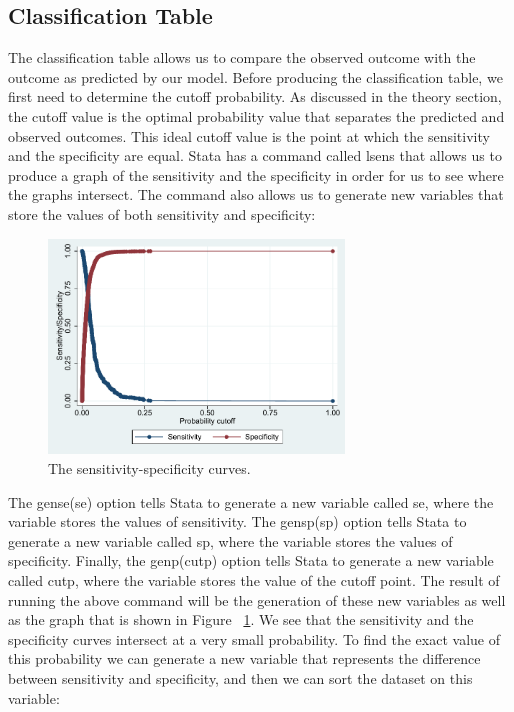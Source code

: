 \documentclass[a4paper,12pt,oneside]{book}
\begin{document}
\subsection{Classification Table}
The classification table allows us to compare the observed outcome with the outcome as predicted by our model. Before producing the classification table, we first need to determine the cutoff 
probability. As discussed in the theory section, the cutoff value is the optimal probability value that separates the predicted and observed outcomes. This ideal cutoff value is the point at which the 
sensitivity and the specificity are equal. Stata has a command called lsens that allows us to produce a graph of the sensitivity and the specificity in order for us to see where the graphs intersect. 
The command also allows us to generate new variables that store the values of both sensitivity and specificity:

\begin{stlog}\end{stlog}
\begin{figure}[h]
    \centering
    \includegraphics[width=0.7\textwidth]{book_37.pdf}
    \caption{The sensitivity-specificity curves.}
    \label{fig:sensspec}
\end{figure}

The gense(se) option tells Stata to generate a new variable called se, where the variable stores the values of sensitivity. The gensp(sp) option tells Stata to generate a new 
variable called sp, where the variable stores the values of specificity. Finally, the genp(cutp) option tells Stata to generate a new variable called cutp, where the variable 
stores the value of the cutoff point. The result of running the above command will be the generation of these new variables as well as the graph that is shown in Figure ~\ref{fig:sensspec}. 
We see that the sensitivity and the specificity curves intersect at a very small probability. To find the exact value of this probability we can generate a new variable that 
represents the difference between sensitivity and specificity, and then we can sort the dataset on this variable:
\end{document}
